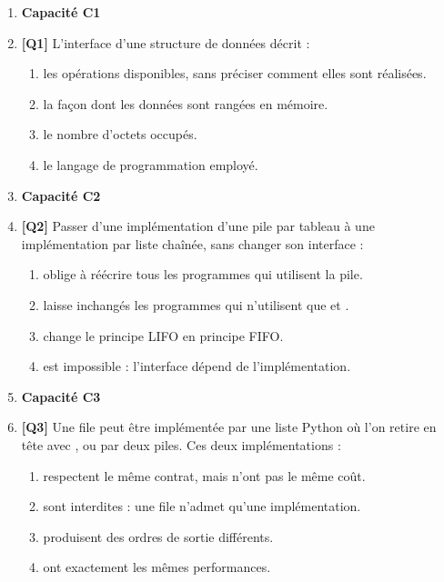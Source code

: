 \begin{enumerate}

\item[] \textbf{Capacité C1}

\item \textbf{[Q1]} L'interface d'une structure de données décrit :
  \begin{enumerate}[label=\Alph*.]
    \item les opérations disponibles, sans préciser comment elles sont réalisées.
    \item la façon dont les données sont rangées en mémoire.
    \item le nombre d'octets occupés.
    \item le langage de programmation employé.
  \end{enumerate}

\item[] \textbf{Capacité C2}

\item \textbf{[Q2]} Passer d'une implémentation d'une pile par tableau à une implémentation par liste chaînée, sans changer son interface :
  \begin{enumerate}[label=\Alph*.]
    \item oblige à réécrire tous les programmes qui utilisent la pile.
    \item laisse inchangés les programmes qui n'utilisent que  et .
    \item change le principe LIFO en principe FIFO.
    \item est impossible : l'interface dépend de l'implémentation.
  \end{enumerate}

\item[] \textbf{Capacité C3}

\item \textbf{[Q3]} Une file peut être implémentée par une liste Python où l'on retire en tête avec , ou par deux piles. Ces deux implémentations :
  \begin{enumerate}[label=\Alph*.]
    \item respectent le même contrat, mais n'ont pas le même coût.
    \item sont interdites : une file n'admet qu'une implémentation.
    \item produisent des ordres de sortie différents.
    \item ont exactement les mêmes performances.
  \end{enumerate}


\end{enumerate}
